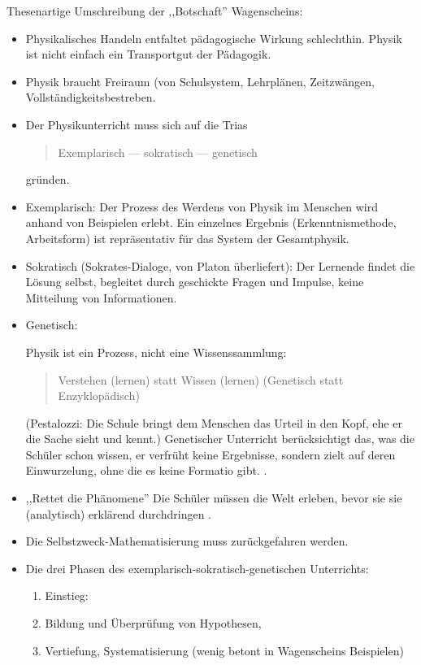 \bip
Thesenartige Umschreibung der ,,Botschaft'' Wagenscheins:
\begin{itemize}

\item Physikalisches Handeln entfaltet p\"{a}dagogische  Wirkung
schlechthin. Physik ist nicht einfach ein Transportgut der P\"{a}dagogik.

\item Physik braucht Freiraum (von Schulsystem, Lehrpl\"{a}nen,
Zeitzw\"{a}ngen, Vollst\"{a}ndigkeitsbestreben.
\item Der Physikunterricht muss sich auf die Trias
\begin{quote}
Exemplarisch --- sokratisch --- genetisch
\end{quote}
gr\"{u}nden.


\item Exemplarisch: Der Prozess des Werdens von Physik im Menschen
wird anhand von Beispielen erlebt.
Ein einzelnes Ergebnis (Erkenntnismethode,
Arbeitsform) ist repr\"{a}sentativ f\"{u}r das System der Gesamtphysik.
\item Sokratisch  (Sokrates-Dialoge, von Platon \"{u}berliefert):
Der Lernende findet die L\"{o}sung selbst, begleitet durch geschickte
Fragen und Impulse, keine Mitteilung von Informationen.


\item Genetisch:

Physik ist ein Prozess, nicht eine Wissenssammlung:
\begin{quote}
Verstehen (lernen) statt Wissen (lernen)  (Genetisch statt
Enzyklop\"{a}disch)
\end{quote}
(Pestalozzi: Die Schule bringt dem Menschen das Urteil in den Kopf,
ehe er die Sache sieht und kennt.)
\mip
Genetischer Unterricht ber\"{u}cksichtigt das, was die
Sch\"{u}ler schon wissen, er verfr\"{u}ht keine Ergebnisse, sondern zielt
auf deren Einwurzelung, ohne die es keine Formatio gibt.
 \autocite[S.\ 107 oben]{DuitHausslerKircher}.

\item ,,Rettet die Ph\"{a}nomene'' Die Sch\"{u}ler m\"{u}ssen die Welt
erleben, bevor sie sie (analytisch) erkl\"{a}rend durchdringen
\autocite[S.\ 90,104]{WagenscheinNSV}.

\item Die Selbstzweck-Mathematisierung muss zur\"{u}ckgefahren werden.

\item Die drei Phasen des exemplarisch-sokratisch-genetischen Unterrichts:
\begin{enumerate}
\item Einstieg: 
\autocite[S.\ 205]{WagenscheinPDP}
\item Bildung und \"{U}berpr\"{u}fung von Hypothesen,
\item Vertiefung, Systematisierung (wenig betont in Wagenscheins
Beispielen)
\end{enumerate}


\end{itemize}
